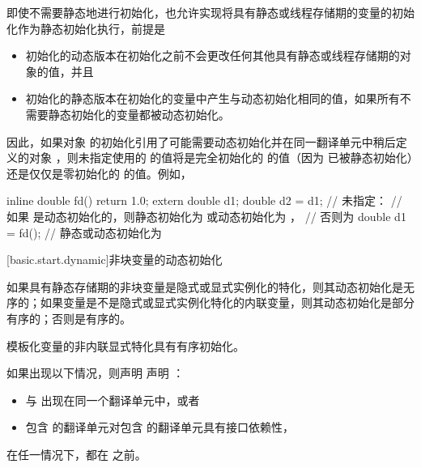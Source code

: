 \pnum
即使不需要静态地进行初始化，也允许实现将具有静态或线程存储期的变量的初始化作为静态初始化执行，前提是
\begin{itemize}
\item
初始化的动态版本在初始化之前不会更改任何其他具有静态或线程存储期的对象的值，并且

\item
初始化的静态版本在初始化的变量中产生与动态初始化相同的值，如果所有不需要静态初始化的变量都被动态初始化。
\end{itemize}
\begin{note}
因此，如果对象  的初始化引用了可能需要动态初始化并在同一翻译单元中稍后定义的对象 ，则未指定使用的  的值将是完全初始化的  的值（因为  已被静态初始化）还是仅仅是零初始化的  的值。例如，
\begin{codeblock}
inline double fd() { return 1.0; }
extern double d1;
double d2 = d1;     // 未指定：
                    // 如果  是动态初始化的，则静态初始化为  或动态初始化为 ，
                    // 否则为 
double d1 = fd();   // 静态或动态初始化为 
\end{codeblock}
\end{note}

[basic.start.dynamic]{非块变量的动态初始化}

\pnum
{}%
%
%
如果具有静态存储期的非块变量是隐式或显式实例化的特化，则其动态初始化是无序的；如果变量是不是隐式或显式实例化特化的内联变量，则其动态初始化是部分有序的；否则是有序的。
\begin{note}
模板化变量的非内联显式特化具有有序初始化。
\end{note}

\pnum
如果出现以下情况，则声明   声明 ：
\begin{itemize}
\item {} 与  出现在同一个翻译单元中，或者
\item 包含  的翻译单元对包含  的翻译单元具有接口依赖性，
\end{itemize}
在任一情况下，都在  之前。

